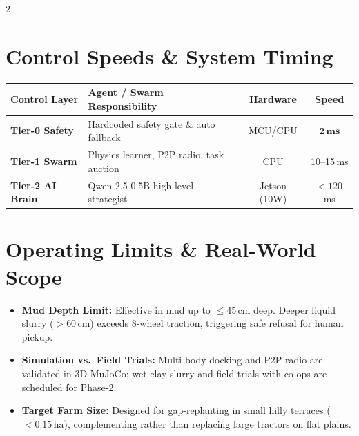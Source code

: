 \documentclass[9pt,a4paper]{article}
\begin{document}
\begin{multicols}{2}
\section{\textbf{Control Speeds \& System Timing}}
\begin{center}
\scriptsize
\begin{tabular}{llcc}
\toprule
\textbf{Control Layer} & \textbf{Agent / Swarm Responsibility} & \textbf{Hardware} & \textbf{Speed} \\
\midrule
\textbf{Tier-0 Safety} & Hardcoded safety gate \& auto fallback & MCU/CPU & $\mathbf{2\,\text{ms}}$ \\
\textbf{Tier-1 Swarm} & Physics learner, P2P radio, task auction & CPU & 10--15\,ms \\
\textbf{Tier-2 AI Brain} & Qwen 2.5 0.5B high-level strategist & Jetson (10W) & $<120$\,ms \\
\bottomrule
\end{tabular}
\end{center}

\section{\textbf{Operating Limits \& Real-World Scope}}
\begin{itemize}
    \item \textbf{Mud Depth Limit:} Effective in mud up to $\le 45\,\text{cm}$ deep. Deeper liquid slurry ($>60\,\text{cm}$) exceeds 8-wheel traction, triggering safe refusal for human pickup.
    \item \textbf{Simulation vs.\ Field Trials:} Multi-body docking and P2P radio are validated in 3D MuJoCo; wet clay slurry and field trials with co-ops are scheduled for Phase-2.
    \item \textbf{Target Farm Size:} Designed for gap-replanting in small hilly terraces ($<0.15\,\text{ha}$), complementing rather than replacing large tractors on flat plains.
\end{itemize}


\end{multicols}
\end{document}
